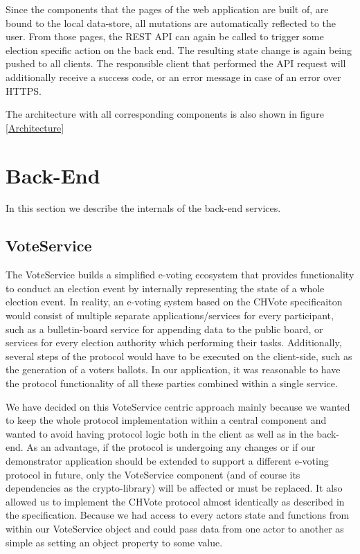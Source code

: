 Since the components that the pages of the web application are built of, are bound to the local data-store, all mutations are automatically reflected to the user. From those pages, the REST API can again be called to trigger some election specific action on the back end. The resulting state change is again being pushed to all clients. The responsible client that performed the API request will additionally receive a success code, or an error message in case of an error over HTTPS.

The architecture with all corresponding components is also shown in figure \ref{Architecture}
\section{Back-End}
In this section we describe the internals of the back-end services. 
\subsection{VoteService}
The VoteService builds a simplified e-voting ecosystem that provides functionality to conduct an election event by internally representing the state of a whole election event. In reality, an e-voting system based on the CHVote specificaiton would consist of multiple separate applications/services for every participant, such as a bulletin-board service for appending data to the public board, or services for every election authority which performing their tasks. Additionally, several steps of the protocol would have to be executed on the client-side, such as the generation of a voters ballots. In our application, it was reasonable to have the protocol functionality of all these parties combined within a single service. 

We have decided on this VoteService centric approach mainly because we wanted to keep the whole protocol implementation within a central component and wanted to avoid having protocol logic both in the client as well as in the back-end. As an advantage, if the protocol is undergoing any changes or if our demonstrator application should be extended to support a different e-voting protocol in future, only the VoteService component (and of course its dependencies as the crypto-library) will be affected or must be replaced. It also allowed us to implement the CHVote protocol almost identically as described in the specification. Because we had access to every actors state and functions from within our VoteService object and could pass data from one actor to another as simple as setting an object property to some value. 

